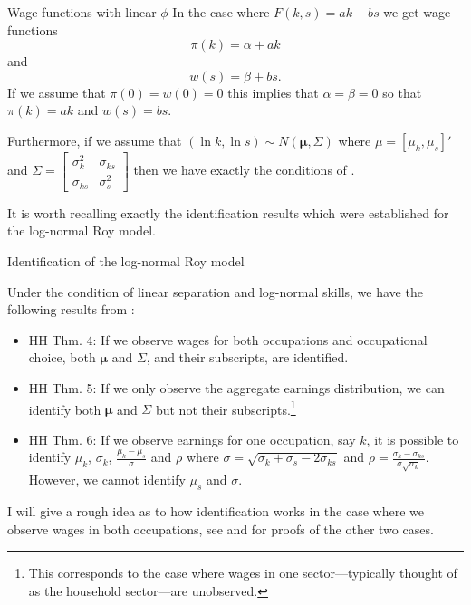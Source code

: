 \documentclass{beamer}
\begin{document}
	\begin{frame}{Wage functions with linear $\phi$}
		In the case where $F(k,s) = ak + bs$ we get wage functions
		\begin{equation*}
			\pi(k) = \alpha + ak
		\end{equation*}
		and
		\begin{equation*}
			w(s) = \beta + bs.
		\end{equation*}
		If we assume that $\pi(0) = w(0) = 0$ this implies that $\alpha=\beta=0$ so that $\pi(k)=ak$ and $w(s)=bs$.
		
		\bigskip
		
		Furthermore, if we assume that $(\ln k, \ln s) \sim N(\mathbf{\mu},\Sigma)$ where $\mu = [\mu_k,\mu_s]'$ and $\Sigma=\begin{bmatrix}
			\sigma_k^2 & \sigma_{ks} \\
			\sigma_{ks} & \sigma_s^2
		\end{bmatrix}$ then we have exactly the conditions of \citet{heckman1990empirical}.\\
		
		\bigskip
		
		It is worth recalling exactly the identification results which were established for the log-normal Roy model.
	\end{frame}
	
	\begin{frame}{Identification of the log-normal Roy model}
		\begin{theorem}
			Under the condition of linear separation and log-normal skills, we have the following results from \citet{heckman1990empirical}:
			\begin{itemize}
				\item HH Thm. 4: If we observe wages for both occupations and occupational choice, both $\mathbf{\mu}$ and $\Sigma$, and their subscripts, are identified.
				\smallskip
				\item  HH Thm. 5: If we only observe the aggregate earnings distribution, we can identify both $\mathbf{\mu}$ and $\Sigma$ but not their subscripts.\footnote{This corresponds to the case where wages in one sector---typically thought of as the household sector---are unobserved.}
				\smallskip
				\item HH Thm. 6: If we observe earnings for one occupation, say $k$, it is possible to identify $\mu_k$, $\sigma_k$, $\frac{\mu_k - \mu_s}{\sigma}$ and $\rho$ where $\sigma = \sqrt{\sigma_k + \sigma_s -2 \sigma_{ks}}$ and $\rho = \frac{\sigma_k - \sigma_{ks}}{\sigma\sqrt{\sigma_k}}$. However, we cannot identify $\mu_s$ and $\sigma$.
			\end{itemize}
		\end{theorem}

		I will give a rough idea as to how identification works in the case where we observe wages in both occupations, see \citet{basu1978identifiability} and \citet{heckman1990empirical} for proofs of the other two cases.
		
	\end{frame}
	
\end{document}
